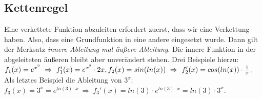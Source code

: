 \subsection{Kettenregel}
	Eine verkettete Funktion abzuleiten erfordert zuerst, dass wir eine Verkettung
	haben. Also, dass eine Grundfunktion in eine andere eingesetzt wurde. Dann gilt
	der Merksatz \emph{innere Ableitung mal äußere Ableitung}. Die innere Funktion
	in der abgeleiteten äußeren bleibt aber unverändert stehen.
	\formel{\[h(x)=f(g(x))\ \Rightarrow\ h'(x)=f'(g(x))\cdot g'(x)\]}
	Drei Beispiele hierzu: \(f_1(x)=e^{x^2}\ \Rightarrow\ f_1'(x)=e^{x^2}\cdot
	2x,\\
	f_2(x)=sin(ln(x))\ \Rightarrow\ f_2'(x)=cos(ln(x))\cdot \frac{1}{x}\).\\
	Als letztes Beispiel die Ableitung von \(3^x\): \(f_3(x)=3^x=e^{ln(3)\cdot x}\
	\Rightarrow\ f_3'(x)=ln(3)\cdot e^{ln(3)\cdot x}=ln(3)\cdot 3^x\).
	
